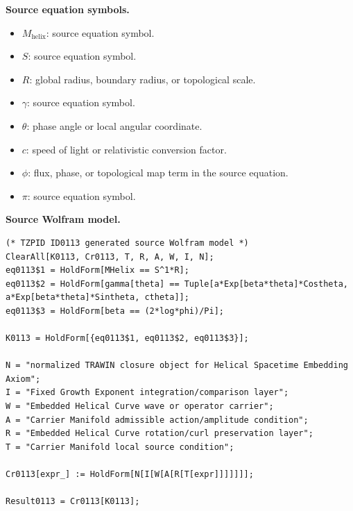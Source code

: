 \begin{minipage}[t]{0.49\linewidth}
\begingroup
\small
\raggedright
\textbf{Source equation symbols.}\par
\begin{itemize}[leftmargin=1.35em,itemsep=1pt,topsep=1pt,parsep=0pt]
    \item $M_{\mathrm{helix}}$: source equation symbol.
    \item $S$: source equation symbol.
    \item $R$: global radius, boundary radius, or topological scale.
    \item $\gamma$: source equation symbol.
    \item $\theta$: phase angle or local angular coordinate.
    \item $c$: speed of light or relativistic conversion factor.
    \item $\phi$: flux, phase, or topological map term in the source equation.
    \item $\pi$: source equation symbol.
\end{itemize}
\endgroup
\end{minipage}\hfill
\begin{minipage}[t]{0.47\linewidth}
\begingroup
\scriptsize
\raggedright
\textbf{Source Wolfram model.}\par
\begin{Verbatim}[fontsize=\tiny,breaklines=true,breakanywhere=true]
(* TZPID ID0113 generated source Wolfram model *)
ClearAll[K0113, Cr0113, T, R, A, W, I, N];
eq0113$1 = HoldForm[MHelix == S^1*R];
eq0113$2 = HoldForm[gamma[theta] == Tuple[a*Exp[beta*theta]*Costheta, a*Exp[beta*theta]*Sintheta, ctheta]];
eq0113$3 = HoldForm[beta == (2*log*phi)/Pi];

K0113 = HoldForm[{eq0113$1, eq0113$2, eq0113$3}];

N = "normalized TRAWIN closure object for Helical Spacetime Embedding Axiom";
I = "Fixed Growth Exponent integration/comparison layer";
W = "Embedded Helical Curve wave or operator carrier";
A = "Carrier Manifold admissible action/amplitude condition";
R = "Embedded Helical Curve rotation/curl preservation layer";
T = "Carrier Manifold local source condition";

Cr0113[expr_] := HoldForm[N[I[W[A[R[T[expr]]]]]]];

Result0113 = Cr0113[K0113];
\end{Verbatim}
\endgroup
\end{minipage}

